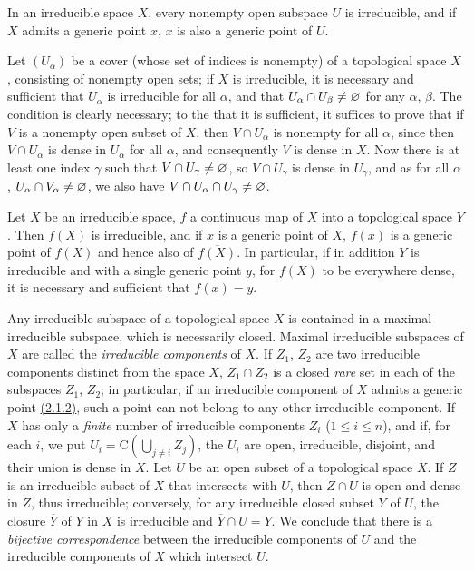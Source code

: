 \begin{env}[2.1.4]
\label{env-0.2.1.4}
In an irreducible space $X$, every nonempty open subspace $U$ is irreducible,
and if $X$ admits a generic point $x$, $x$ is also a generic point of $U$.

Let $(U_\alpha)$ be a cover (whose set of indices is nonempty) of a topological
space $X$, consisting of nonempty open sets; if $X$ is irreducible, it is
necessary and sufficient that $U_\alpha$ is irreducible for all $\alpha$, and
that $U_\alpha\cap U_\beta\neq\varnothing$ for any $\alpha$, $\beta$. The condition is
clearly necessary; to the that it is sufficient, it suffices to prove that if
$V$ is a nonempty open subset of $X$, then $V\cap U_\alpha$ is nonempty for all
$\alpha$, since then $V\cap U_\alpha$ is dense in $U_\alpha$ for all $\alpha$,
and consequently $V$ is dense in $X$. Now there is at least one index $\gamma$
such that $V\cap U_\gamma\neq\varnothing$, so $V\cap U_\gamma$ is dense in $U_\gamma$,
and as for all $\alpha$, $U_\alpha\cap V_\alpha\neq\varnothing$, we also have
$V\cap U_\alpha\cap U_\gamma\neq\varnothing$.
\end{env}

\begin{env}[2.1.5]
\label{env-0.2.1.5}
Let $X$ be an irreducible space, $f$ a continuous map of $X$ into a topological
space $Y$. Then $f(X)$ is irreducible, and if $x$ is a generic point of $X$,
$f(x)$ is a generic point of $f(X)$ and hence also of $\overline{f(X)}$. In
particular, if in addition $Y$ is irreducible and with a single generic point
$y$, for $f(X)$ to be everywhere dense, it is necessary and sufficient that
$f(x)=y$.
\end{env}

\begin{env}[2.1.6]
\label{env-0.2.1.6}
Any irreducible subspace of a topological space $X$ is contained in a maximal
irreducible subspace, which is necessarily closed. Maximal irreducible subspaces
of $X$ are called the {\em irreducible components} of $X$. If $Z_1$, $Z_2$ are
two irreducible components distinct from the space $X$, $Z_1\cap Z_2$ is a
closed {\em rare} set in each of the subspaces $Z_1$, $Z_2$; in particular, if
an irreducible component of $X$ admits a generic point \hyperref[env-0.2.1.2]{(2.1.2)}, such a
point can not belong to any other irreducible component. If $X$ has only a
{\em finite} number of irreducible components $Z_i$
($1\leqslant i\leqslant n$), and if, for each $i$, we put
$U_i=\mathrm{C}(\bigcup_{j\neq i}Z_j)$, the $U_i$ are open, irreducible,
disjoint, and their union is dense in $X$. Let $U$ be an open subset of a
topological space $X$. If $Z$ is an irreducible subset of $X$ that intersects
with $U$, then $Z\cap U$ is open and dense in $Z$, thus irreducible; conversely,
for any irreducible closed subset $Y$ of $U$, the closure $\overline{Y}$ of $Y$
in $X$ is irreducible and $\overline{Y}\cap U=Y$. We conclude that there is a
{\em bijective correspondence} between the irreducible components of $U$ and
the irreducible components of $X$ which intersect $U$.
\end{env}

